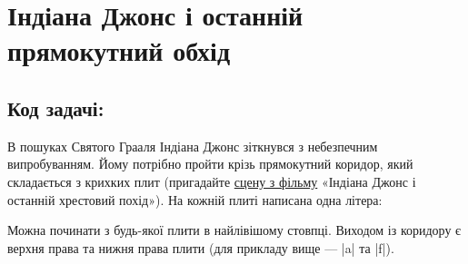 \documentclass[12pt,a4paper]{article}
\begin{document}
\section*{Індіана Джонс і останній прямокутний обхід \hfill {}}


\subsection*{Код задачі: }

В пошуках Святого Грааля Індіана Джонс зіткнувся з небезпечним випробуванням.
Йому потрібно пройти крізь прямокутний коридор, який складається з крихких плит (пригадайте \href{https://www.youtube.com/watch?v=arMXzgiZsJQ}{сцену з фільму} «Індіана Джонс і останній хрестовий похід»).
На кожній плиті написана одна літера:

\begin{center}
\end{center}

Можна починати з будь-якої плити в найлівішому стовпці. Виходом із коридору є верхня права та нижня права плити (для прикладу вище --- |a| та |f|).
\end{document}
